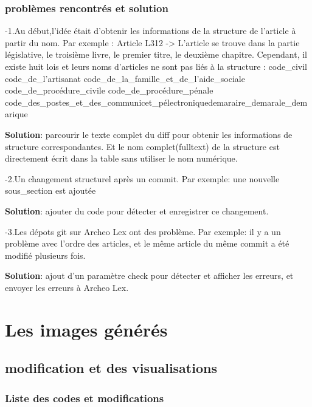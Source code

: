 \documentclass[
  oneside]{book}
\begin{document}
\hypertarget{probluxe8mes-rencontruxe9s-et-solution}{%
\subsection{problèmes rencontrés et solution}\label{probluxe8mes-rencontruxe9s-et-solution}}

-1.Au début,l'idée était d'obtenir les informations de la structure de l'article à partir du nom. Par exemple : Article L312 -\textgreater{} L'article se trouve dans la partie législative, le troisième livre, le premier titre, le deuxième chapitre.
Cependant, il existe huit lois et leurs noms d'articles ne sont pas liés à la structure : code\_civil code\_de\_l'artisanat code\_de\_la\_famille\_et\_de\_l'aide\_sociale code\_de\_procédure\_civile code\_de\_procédure\_pénale code\_des\_postes\_et\_des\_communicet\_pélectroniquedemaraire\_demarale\_demarique

\textbf{Solution}: parcourir le texte complet du diff pour obtenir les informations de structure correspondantes. Et le nom complet(fulltext) de la structure est directement écrit dans la table sans utiliser le nom numérique.

-2.Un changement structurel après un commit. Par exemple: une nouvelle sous\_section est ajoutée

\textbf{Solution}: ajouter du code pour détecter et enregistrer ce changement.

-3.Les dépots git sur Archeo Lex ont des problème. Par exemple: il y a un problème avec l'ordre des articles, et le même article du même commit a été modifié plusieurs fois.

\textbf{Solution}: ajout d'un paramètre check pour détecter et afficher les erreurs, et envoyer les erreurs à Archeo Lex.

\hypertarget{Images}{%
\chapter{Les images générés}\label{Images}}

\hypertarget{modification-et-des-visualisations}{%
\section{modification et des visualisations}\label{modification-et-des-visualisations}}

\hypertarget{liste-des-codes-et-modifications}{%
\subsection{Liste des codes et modifications}\label{liste-des-codes-et-modifications}}
\end{document}
